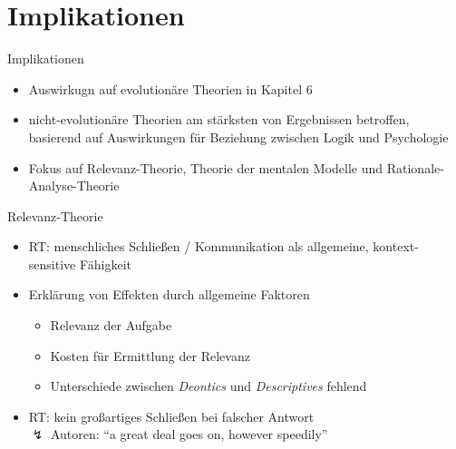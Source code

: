 
\section{Implikationen}

\begin{frame}{Implikationen {\scriptsize \cite[S.~112-113]{stenningHumanReasoningCognitive2008}}}
    \begin{itemize}
        \item Auswirkugn auf evolutionäre Theorien  in Kapitel 6
        \item nicht-evolutionäre Theorien am stärksten von Ergebnissen betroffen,
            basierend auf Auswirkungen für Beziehung zwischen Logik und Psychologie
        \item Fokus auf Relevanz-Theorie, Theorie der mentalen Modelle und Rationale-Analyse-Theorie
    \end{itemize}
\end{frame}


\begin{frame}{Relevanz-Theorie {\scriptsize \cite[S.~113-114]{stenningHumanReasoningCognitive2008}}}
    \begin{itemize}
        \item RT: menschliches Schließen / Kommunikation als allgemeine, kontext-sensitive Fähigkeit
        \item Erklärung von Effekten durch allgemeine Faktoren
        \begin{itemize}
            \item Relevanz der Aufgabe
            \item Kosten für Ermittlung der Relevanz
            \item Unterschiede zwischen \emph{Deontics} und \emph{Descriptives} fehlend
        \end{itemize}
        \item RT: kein großartiges Schließen bei falscher Antwort \\
            $\lightning$ Autoren: \enquote{a great deal goes on, however speedily}
    \end{itemize}
\end{frame}


